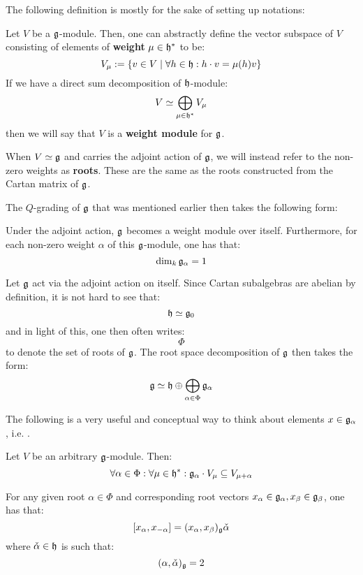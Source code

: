         The following definition is mostly for the sake of setting up notations:
        \begin{definition}
            Let $V$ be a $\mathfrak{g}$-module. Then, one can abstractly define the vector subspace of $V$ consisting of elements of \textbf{weight} $\mu \in \mathfrak{h}^*$ to be:
                $$V_{\mu} := \{v \in V \mid \forall h \in \mathfrak{h}: h \cdot v = \mu(h) v\}$$
            If we have a direct sum decomposition of $\mathfrak{h}$-module:
                $$V \simeq \bigoplus_{\mu \in \mathfrak{h}^*} V_{\mu}$$
            then we will say that $V$ is a \textbf{weight module} for $\mathfrak{g}$. 

            When $V \simeq \mathfrak{g}$ and carries the adjoint action of $\mathfrak{g}$, we will instead refer to the non-zero weights as \textbf{roots}. These are the same as the roots constructed from the Cartan matrix of $\mathfrak{g}$.
        \end{definition}
        The $Q$-grading of $\mathfrak{g}$ that was mentioned earlier then takes the following form:
        \begin{theorem} \label{theorem: root_space_decomposition_for_finite_dimensional_simple_lie_algebras}
            Under the adjoint action, $\mathfrak{g}$ becomes a weight module over itself. Furthermore, for each non-zero weight $\alpha$ of this $\mathfrak{g}$-module, one has that:
                $$\dim_k \mathfrak{g}_{\alpha} = 1$$
        \end{theorem}
        \begin{convention}
            Let $\mathfrak{g}$ act via the adjoint action on itself. Since Cartan subalgebras are abelian by definition, it is not hard to see that:
                $$\mathfrak{h} \simeq \mathfrak{g}_0$$
            and in light of this, one then often writes:
                $$\Phi$$
            to denote the set of roots of $\mathfrak{g}$. The root space decomposition of $\mathfrak{g}$ then takes the form:
                $$\mathfrak{g} \simeq \mathfrak{h} \oplus \bigoplus_{\alpha \in \Phi} \mathfrak{g}_{\alpha}$$
        \end{convention}
        The following is a very useful and conceptual way to think about elements $x \in \mathfrak{g}_{\alpha}$, i.e. . 
        \begin{lemma}
            Let $V$ be an arbitrary $\mathfrak{g}$-module. Then:
                $$\forall \alpha \in \Phi: \forall \mu \in \mathfrak{h}^*: \mathfrak{g}_{\alpha} \cdot V_{\mu} \subseteq V_{\mu + \alpha}$$
        \end{lemma}
        \begin{corollary}
            For any given root $\alpha \in \Phi$ and corresponding root vectors $x_{\alpha} \in \mathfrak{g}_{\alpha}, x_{\beta} \in \mathfrak{g}_{\beta}$, one has that:
                $$[x_{\alpha}, x_{-\alpha}] = (x_{\alpha}, x_{\beta})_{\mathfrak{g}} \check{\alpha}$$
            where $\check{\alpha} \in \mathfrak{h}$ is such that:
                $$(\alpha, \check{\alpha})_{\mathfrak{g}} = 2$$
        \end{corollary}
